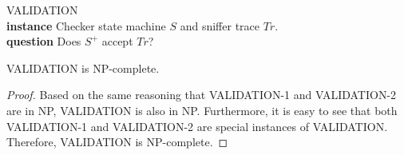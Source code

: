 \begin{problem}
  VALIDATION\\
  \textbf{instance} Checker state machine $S$ and sniffer trace $Tr$.\\
  \textbf{question} Does $S^+$ accept $Tr$?
\end{problem}

\begin{theorem}
  VALIDATION is NP-complete.
\end{theorem}
\begin{proof}
  Based on the same reasoning that VALIDATION-1 and VALIDATION-2 are
  in NP, VALIDATION is also in NP. Furthermore, it is easy to see that both
  VALIDATION-1 and VALIDATION-2 are special instances of
  VALIDATION. Therefore, VALIDATION is NP-complete.
\end{proof}
